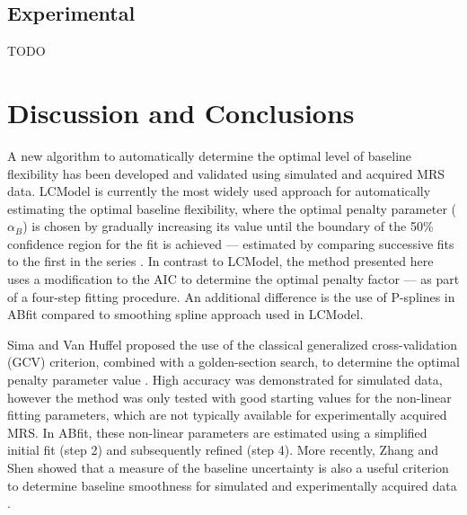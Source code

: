 \documentclass[num-refs]{wiley-article}
\begin{document}
\subsection{Experimental}
TODO

\section{Discussion and Conclusions}
A new algorithm to automatically determine the optimal level of baseline flexibility has been developed and validated using simulated and acquired MRS data. LCModel is currently the most widely used approach for automatically estimating the optimal baseline flexibility, where the optimal penalty parameter ($\alpha_{B}$) is chosen by gradually increasing its value until the boundary of the 50\% confidence region for the fit is achieved --- estimated by comparing successive fits to the first in the series \cite{Provencher1982, Provencher1993}. In contrast to LCModel, the method presented here uses a modification to the AIC to determine the optimal penalty factor --- as part of a four-step fitting procedure. An additional difference is the use of P-splines in ABfit compared to smoothing spline approach \cite{OSullivan} used in LCModel.

Sima and Van Huffel proposed the use of the classical generalized cross-validation (GCV) criterion, combined with a golden-section search, to determine the optimal penalty parameter value \cite{Sima2006}. High accuracy was demonstrated for simulated data, however the method was only tested with good starting values for the non-linear fitting parameters, which are not typically available for experimentally acquired MRS. In ABfit, these non-linear parameters are estimated using a simplified initial fit (step 2) and subsequently refined (step 4). More recently, Zhang and Shen
showed that a measure of the baseline uncertainty is also a useful criterion to determine baseline smoothness for simulated and experimentally acquired data \cite{Zhang2014}.


\end{document}
